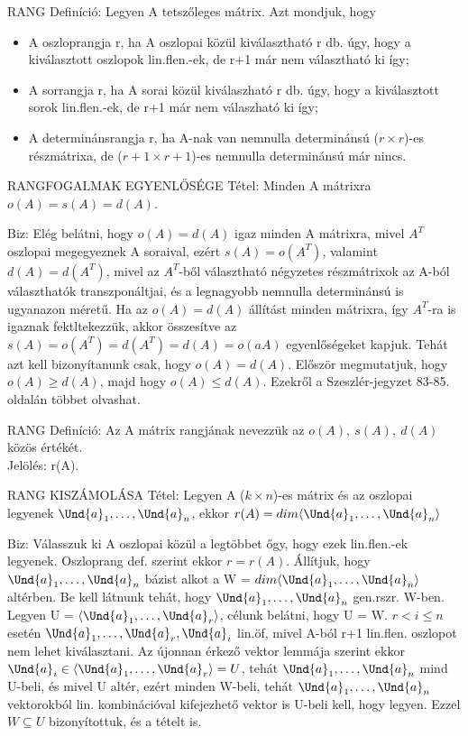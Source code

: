 \begin{definicio}{
RANG Definíció}: Legyen A tetszőleges mátrix. Azt mondjuk, hogy
\begin{itemize}
\item A oszloprangja r, ha A oszlopai közül kiválasztható r db. úgy, hogy a kiválasztott oszlopok lin.flen.-ek, de r+1 már nem választható ki így;
\item A sorrangja r, ha A sorai közül kiválaszható r db. úgy, hogy a kiválasztott sorok lin.flen.-ek, de r+1 már nem válaszható ki így;
\item A determinánsrangja r, ha A-nak van nemnulla determinánsú ($r \times r$)-es részmátrixa, de ($r+1 \times r+1$)-es nemnulla determinánsú már nincs.
\end{itemize}
\end{definicio}
\begin{tetel}{
RANGFOGALMAK EGYENLŐSÉGE Tétel}: Minden A mátrixra $o(A) = s(A) = d(A)$.
\end{tetel}
\begin{leftbar}
Biz: Elég belátni, hogy $o(A) = d(A)$ igaz minden A mátrixra, mivel $A^T$ oszlopai megegyeznek A soraival, ezért $s(A) = o(A^T)$, valamint $d(A) = d(A^T)$, mivel az $A^T$-ből választható négyzetes részmátrixok az A-ból választhatók transzponáltjai, és a legnagyobb nemnulla determinánsú is ugyanazon méretű. Ha az $o(A) = d(A)$ állítást minden mátrixra, így $A^T$-ra is igaznak fektltekezzük, akkor összesítve az $s(A) = o(A^T) = d(A^T) = d(A) = o(aA)$ egyenlőségeket kapjuk. Tehát azt kell bizonyítanunk csak, hogy $o(A) = d(A)$. Először megmutatjuk, hogy $o(A) \geq d(A)$, majd hogy $o(A) \leq d(A)$. Ezekről a Szeszlér-jegyzet 83-85. oldalán többet olvashat.
\end{leftbar}
\begin{definicio}{
RANG Definíció}: Az A mátrix rangjának nevezzük az $o(A),\: s(A),\: d(A)$ közös értékét.\\
Jelölés: r(A).
\end{definicio}
\begin{tetel}{
RANG KISZÁMOLÁSA Tétel}: Legyen A ($k \times n$)-es mátrix és az oszlopai legyenek $\Und{a}_1, \ldots, \Und{a}_n$, ekkor $r(A) = dim\langle\Und{a}_1, \ldots, \Und{a}_n\rangle$
\end{tetel}
\begin{leftbar}
Biz: Válasszuk ki A oszlopai közül a legtöbbet őgy, hogy ezek lin.flen.-ek legyenek. Oszloprang def. szerint ekkor $r = r(A)$. Állítjuk, hogy $\Und{a}_1, \ldots, \Und{a}_n$ bázist alkot a W = $dim\langle\Und{a}_1, \ldots, \Und{a}_n\rangle$ altérben. Be kell látnunk tehát, hogy $\Und{a}_1, \ldots, \Und{a}_n$ gen.rszr. W-ben. Legyen U = $\langle\Und{a}_1, \ldots, \Und{a}_r\rangle$, célunk belátni, hogy U = W. $r < i \leq n$ esetén $\Und{a}_1, \ldots, \Und{a}_r, \Und{a}_i$ lin.öf, mivel A-ból r+1 lin.flen. oszlopot nem lehet kiválasztani. Az újonnan érkező vektor lemmája szerint ekkor $\Und{a}_i\in\langle\Und{a}_1, \ldots, \Und{a}_r\rangle = U$, tehát $\Und{a}_1, \ldots, \Und{a}_n$ mind U-beli, és mivel U altér, ezért minden W-beli, tehát $\Und{a}_1, \ldots, \Und{a}_n$ vektorokból lin. kombinációval kifejezhető vektor is U-beli kell, hogy legyen. Ezzel $W \subseteq U$ bizonyítottuk, és a tételt is.
\end{leftbar}
